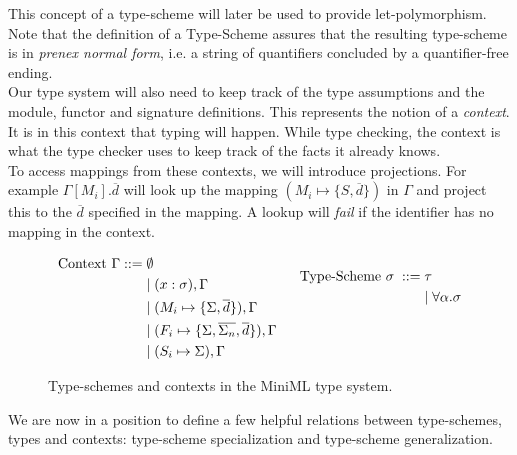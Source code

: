 \documentclass[10pt,a4paper,draft]{article}
\begin{document}
\begin{flushleft}
This concept of a type-scheme will later be used to provide let-polymorphism.  Note that the definition of a Type-Scheme assures that the resulting type-scheme is in \emph{prenex normal form}, i.e. a string of quantifiers concluded by a quantifier-free ending.
\\[2ex]
Our type system will also need to keep track of the type assumptions and the module, functor and signature definitions. This represents the notion of a \emph{context}. It is in this context that typing will happen. While type checking, the context is what the type checker uses to keep track of the facts it already knows.
\\[2ex]
To access mappings from these contexts, we will introduce projections. For example $\Gamma[M_{i}].\overline{d}$ will look up the mapping $(M_{i} \mapsto \lbrace S,\overline{d}\rbrace)$ in $\Gamma$ and project this to the $\overline{d}$ specified in the mapping. A lookup will \emph{fail} if the identifier has no mapping in the context.

\begin{figure}[!htbp]
\begin{align*}
\begin{aligned}
\text{Context }\Gamma ::=\; &\emptyset \\
&| \; (x:\sigma),\Gamma \\
&| \; (M_{i} \mapsto \lbrace \Sigma,\overline{d}\rbrace), \Gamma \\
&| \; (F_{i} \mapsto \lbrace \Sigma, \overline{\Sigma_{n}}, \overline{d} \rbrace), \Gamma \\
&| \; (S_{i} \mapsto \Sigma), \Gamma
\end{aligned}
\begin{aligned}
\;\;\;\;\;\;
\end{aligned}
\begin{aligned}
\text{Type-Scheme } \sigma \; ::= \; &\tau \\
&| \; \forall \alpha . \sigma \\
\\
\\
\end{aligned}
\end{align*}
\caption{Type-schemes and contexts in the MiniML type system.}
\label{fig:Type-schemesAndContexts}
\end{figure}

We are now in a position to define a few helpful relations between type-schemes, types and contexts: type-scheme specialization and type-scheme generalization.


\end{flushleft}
\end{document}
